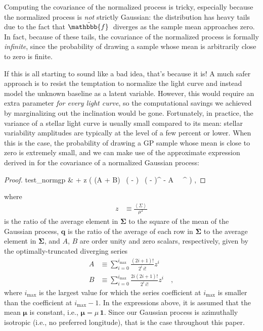 \documentclass[modern]{aastex62}
\begin{document}
Computing the covariance of the normalized process is tricky, especially
because the normalized process is \emph{not} strictly Gaussian: the distribution
has heavy tails due to the fact that $\tilde{\mathbbb{f}\hspace{0.2em}}$ diverges as
the sample mean approaches zero. In fact, because of these tails, the covariance
of the normalized process is formally \emph{infinite}, since the probability of
drawing a sample whose mean is arbitrarily close to zero is finite.

If this is all starting to sound like a bad idea, that's because it is!
A much safer approach is to resist the temptation to normalize the light curve
and instead model the unknown baseline as a latent variable. However,
this would require an extra parameter \emph{for every light curve}, so the
computational savings we achieved by marginalizing out the inclination
would be gone. Fortunately, in practice, the variance of a stellar light curve
is usually small compared to its mean: stellar variability amplitudes are
typically at the level of a few percent or lower. When this is the case,
the probability of drawing a GP sample whose mean is close to zero is
extremely small, and we can make use of the approximate expression derived
in \citet{Luger2020} for the covariance of a normalized Gaussian process:
%
\begin{proof}{test_normgp}
    \label{eq:SigmaTilde}
    \tilde{\pmb{\Sigma}}
    & \approx
     \pmb{\Sigma} +
    z \Big(
    (A + B) \, ( - ) \, ( - )^\top
    - A \,  \, ^\top
    \Big)
    \quad,
\end{proof}
%
where
%
\begin{align}
    \label{eq:z}
    z & \equiv \frac{\left< \Sigma \right>}{\mu^2}
\end{align}
%
is the ratio of the average element in $\pmb{\Sigma}$
to the square of the mean of the Gaussian process,
$\mathbf{q}$ is the ratio of the average of each row in $\pmb{\Sigma}$
to the average element in $\pmb{\Sigma}$, and $A$, $B$ are
order unity and zero scalars, respectively,
given by the optimally-truncated diverging series
%
\begin{align}
    \label{eq:baseline_alpha}
    A
     & \equiv
    \sum\limits_{i=0}^{i_\mathrm{max}}
    \frac{(2i + 1)!}{2^i \, i!}
    z^i
    \\[1em]
    \label{eq:baseline_beta}
    B
     & \equiv
    \sum\limits_{i=0}^{i_\mathrm{max}}
    \frac{2i(2i + 1)!}{2^i \, i!}
    z^i
    \quad,
\end{align}
%
where $i_\mathrm{max}$ is the largest value for which the series coefficient at $i_\mathrm{max}$ is
smaller than the coefficient at $i_\mathrm{max} - 1$. In the expressions above, it is
assumed that the mean $\pmb{\mu}$ is constant, i.e., $\pmb{\mu} = \mu\, \mathbf{1}$.
Since our Gaussian process is azimuthally isotropic (i.e., no preferred
longitude), that is the case throughout this paper.
\end{document}

